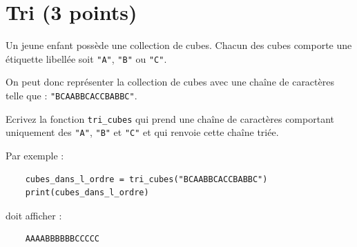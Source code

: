 \documentclass{exam}
\begin{document}
\section{Tri \small{(3 points)}}
\begin{questions}
    \question Un jeune enfant possède une collection de cubes. Chacun des cubes comporte une étiquette libellée soit \texttt{"A"}, \texttt{"B"} ou \texttt{"C"}.

    On peut donc représenter la collection de cubes avec une chaîne de caractères telle que : \texttt{"BCAABBCACCBABBC"}.
    
    Ecrivez la fonction \texttt{tri\_cubes} qui prend une chaîne de caractères comportant uniquement des \texttt{"A"}, \texttt{"B"} et \texttt{"C"} et qui renvoie cette chaîne triée.
    
    
    Par exemple :
    \begin{verbatim}
    cubes_dans_l_ordre = tri_cubes("BCAABBCACCBABBC")
    print(cubes_dans_l_ordre)
    \end{verbatim}
    
    doit afficher :
    
    \begin{verbatim}
    AAAABBBBBBCCCCC
    \end{verbatim}
    
    \vspace*{5cm}

\end{questions}
\end{document}
